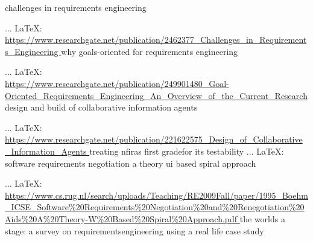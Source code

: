 \begin{thebibliography}{99}
%
%
%
%
%
%
%
%
%
%
%
%
%
%
%
%
%


challenges in requirements engineering

 ... \LaTeX:\\ \url{https://www.researchgate.net/publication/2462377_Challenges_in_Requirements_Engineering }
why goals-oriented for requirements engineering

 ... \LaTeX:\\ \url{https://www.researchgate.net/publication/249901480_Goal-Oriented_Requirements_Engineering_An_Overview_of_the_Current_Research }
design and build of collaborative information agents

 ... \LaTeX:\\ \url{https://www.researchgate.net/publication/221622575_Design_of_Collaborative_Information_Agents }
treating nfiras first gradefor its testability
\bibitem{ } ... \LaTeX:\\ \url{ }
software requirements negotiation a theory ui based spiral approach

 ... \LaTeX:\\ \url{https://www.cs.rug.nl/search/uploads/Teaching/RE2009Fall/paper/1995_Boehm_ICSE_Software%20Requirements%20Negotiation%20and%20Renegotiation%20Aids%20A%20Theory-W%20Based%20Spiral%20Approach.pdf }
the worlds a stage: a survey on requirementsengineering using a real life case study


\end{thebibliography}
